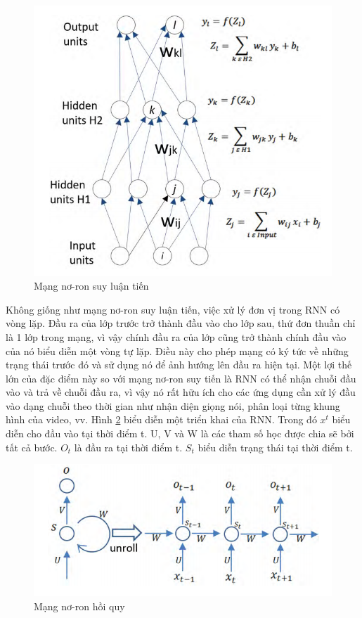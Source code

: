 \begin{figure}[ht!]
	\centering
	\includegraphics[width=0.6\linewidth]{fig/feed-forward-nn.png}
	\caption{Mạng nơ-ron suy luận tiến \cite{62-Shrestha}}
	\label{fig:feed-forward-nn}
\end{figure}

Không giống như mạng nơ-ron suy luận tiến, việc xử lý đơn vị trong RNN có vòng lặp. Đầu ra của lớp trước trở thành đầu vào cho lớp sau, thứ đơn thuần chỉ là 1 lớp trong mạng, vì vậy chính đầu ra của lớp cũng trở thành chính đầu vào của nó biểu diễn một vòng tự lặp. Điều này cho phép mạng có ký tức về những trạng thái trước đó và sử dụng nó để ảnh hướng lên đầu ra hiện tại. Một lợi thế lớn của đặc điểm này so với mạng nơ-ron suy tiến là RNN có thể nhận chuỗi đầu vào và trả về chuỗi đầu ra, vì vậy nó rất hữu ích cho các ứng dụng cần xử lý đầu vào dạng chuỗi theo thời gian như nhận diện giọng nói, phân loại từng khung hình của video, vv. Hình \ref{fig:rnn} biểu diễn một triển khai của RNN. Trong đó \(x^t\) biểu diễn cho đầu vào tại thời điểm t. U, V và W là các  tham số học được chia sẽ bởi tất cả bước. \(O_t\) là đầu ra tại thời điểm t. \(S_t\) biểu diễn trạng thái tại thời điểm t.

\begin{figure}[ht!]
	\centering
	\includegraphics[width=0.75\linewidth]{fig/rnn.png}
	\caption{Mạng nơ-ron hồi quy \cite{62-Shrestha}}
	\label{fig:rnn}
\end{figure}

